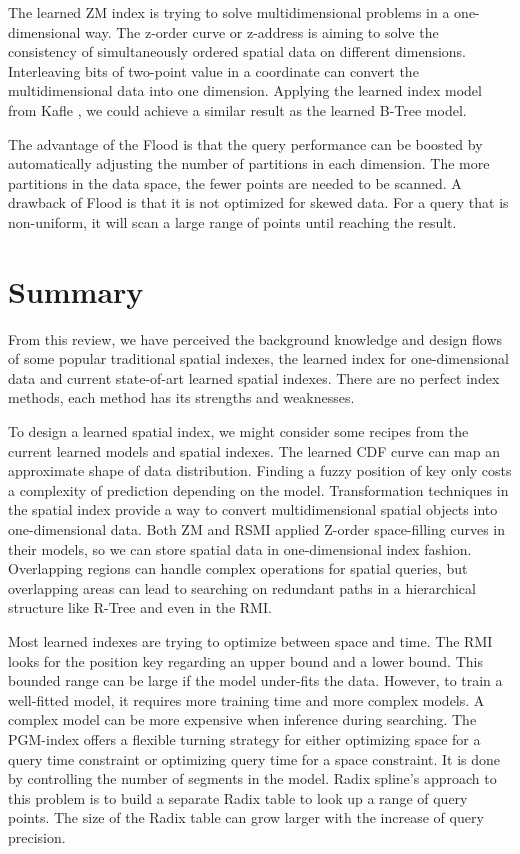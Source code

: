 The learned ZM index is trying to solve multidimensional problems in a one-dimensional way. The z-order curve or z-address is aiming to solve the consistency of simultaneously ordered spatial data on different dimensions. Interleaving bits of two-point value in a coordinate can convert the multidimensional data into one dimension. Applying the learned index model from Kafle \cite{Kafle:2017dy}, we could achieve a similar result as the learned B-Tree model. 

The advantage\cite{Ding:2020we} of the Flood is that the query performance can be boosted by automatically adjusting the number of partitions in each dimension. The more partitions in the data space, the fewer points are needed to be scanned. A drawback of Flood is that it is not optimized for skewed data. For a query that is non-uniform, it will scan a large range of points until reaching the result. 


\section{Summary}
From this review, we have perceived the background knowledge and design flows of some popular traditional spatial indexes, the learned index for one-dimensional data and current state-of-art learned spatial indexes. There are no perfect index methods, each method has its strengths and weaknesses. 

To design a learned spatial index, we might consider some recipes from the current learned models and spatial indexes. The learned CDF curve can map an approximate shape of data distribution. Finding a fuzzy position of key only costs a complexity of prediction depending on the model. Transformation techniques in the spatial index provide a way to convert multidimensional spatial objects into one-dimensional data. Both ZM and RSMI applied Z-order space-filling curves in their models, so we can store spatial data in one-dimensional index fashion. Overlapping regions can handle complex operations for spatial queries, but overlapping areas can lead to searching on redundant paths in a hierarchical structure like R-Tree and even in the RMI. 

Most learned indexes are trying to optimize between space and time. The RMI looks for the position key regarding an upper bound and a lower bound. This bounded range can be large if the model under-fits the data. However, to train a well-fitted model, it requires more training time and more complex models. A complex model can be more expensive when inference during searching.  The PGM-index offers a flexible turning strategy for either optimizing space for a query time constraint or optimizing query time for a space constraint. It is done by controlling the number of segments in the model. Radix spline’s approach to this problem is to build a separate Radix table to look up a range of query points. The size of the Radix table can grow larger with the increase of query precision. 

